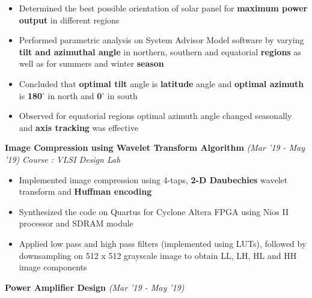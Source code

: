 \documentclass[10 pt]{article}%
\begin{document}
{{{{\vspace{-5pt}
\begin{itemize}[leftmargin=*]
	\setlength\itemsep{1.0pt}
	\setlength\parskip{1.0pt}
  \item Determined the best possible orientation of solar panel for \textbf{maximum power output} in different regions
\item Performed parametric analysis on System Advisor Model software by varying \textbf{tilt and azimuthal angle} in northern, southern and equatorial \textbf{regions} as well as for summers and winter \textbf{season}
\item Concluded that \textbf{optimal tilt} angle is \textbf{latitude} angle and \textbf{optimal azimuth} is \textbf{180$^{\circ}$} in north and \textbf{0$^{\circ}$}  in south
\item Observed for equatorial regions optimal azimuth angle changed seasonally and \textbf{axis tracking} was effective
\end{itemize}
\pagebreak
{\flushleft \textbf {\large{Image Compression using Wavelet Transform Algorithm}} \hfill {{{\em{(Mar '19 - May '19)}}}}
	\vspace{-0.8em}
	{\flushleft \em{Course : VLSI Design Lab}}
	\vspace{-5pt}
	\begin{itemize}[leftmargin=*]
		\setlength\itemsep{1pt}
		\setlength\parskip{1pt}
		\item Implemented image compression using 4-taps, \textbf{2-D Daubechies} wavelet transform and \textbf{Huffman encoding}
		\item Synthesized the code on Quartus for Cyclone Altera FPGA using Nios II processor and SDRAM module
	\item Applied low pass and high pass filters (implemented using LUTs), followed by downsampling on 512 x 512 grayscale image to obtain LL, LH, HL and HH image components
	\end{itemize}
{\flushleft \textbf {\large{Power Amplifier Design}} \hfill {{{\em{(Mar '19 - May '19)}}}}
}}}}}}
\end{document}
